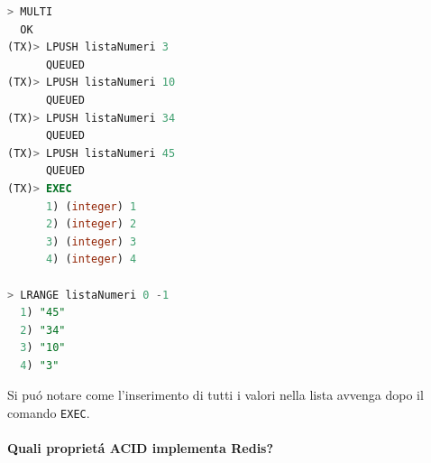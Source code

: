 \begin{lstlisting}[autogobble, style=redis-cli, language=SQL]
> MULTI
  OK
(TX)> LPUSH listaNumeri 3
      QUEUED
(TX)> LPUSH listaNumeri 10
      QUEUED
(TX)> LPUSH listaNumeri 34
      QUEUED
(TX)> LPUSH listaNumeri 45
      QUEUED
(TX)> EXEC
      1) (integer) 1
      2) (integer) 2
      3) (integer) 3
      4) (integer) 4

> LRANGE listaNumeri 0 -1
  1) "45"
  2) "34"
  3) "10"
  4) "3"\end{lstlisting}
Si puó notare come l'inserimento di tutti i valori nella lista avvenga dopo il comando \texttt{EXEC}.\\
\paragraph{Quali proprietá ACID implementa Redis?}
